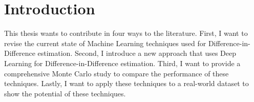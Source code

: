 \section{Introduction}







%
This thesis wants to contribute in four ways to the literature. %
First, I want to revise the current state of Machine Learning techniques used for Difference-in-Difference estimation.%
Second, I introduce a new approach that uses Deep Learning for Difference-in-Difference estimation.%
Third, I want to provide a comprehensive Monte Carlo study to compare the performance of these techniques.%
Lastly, I want to apply these techniques to a real-world dataset to show the potential of these techniques.%


